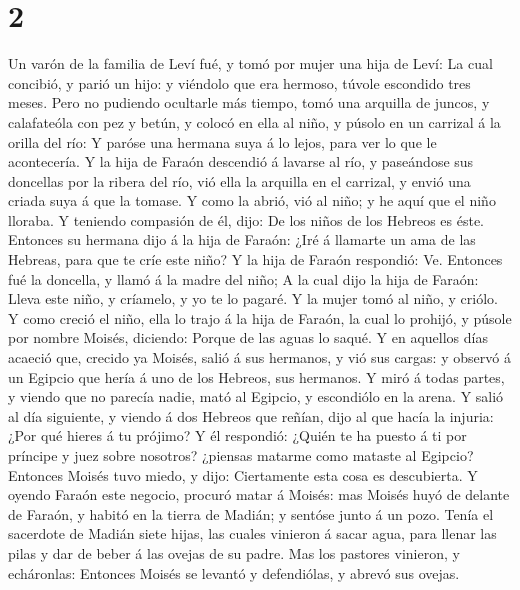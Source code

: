 \hypertarget{section-1}{%
\section{2}\label{section-1}}

 Un varón de la familia de Leví fué, y tomó por mujer una
hija de Leví:  La cual concibió, y parió un hijo: y viéndolo
que era hermoso, túvole escondido tres meses.  Pero no
pudiendo ocultarle más tiempo, tomó una arquilla de juncos, y
calafateóla con pez y betún, y colocó en ella al niño, y púsolo en un
carrizal á la orilla del río:  Y paróse una hermana suya á
lo lejos, para ver lo que le acontecería.  Y la hija de
Faraón descendió á lavarse al río, y paseándose sus doncellas por la
ribera del río, vió ella la arquilla en el carrizal, y envió una criada
suya á que la tomase.  Y como la abrió, vió al niño; y he
aquí que el niño lloraba. Y teniendo compasión de él, dijo: De los niños
de los Hebreos es éste.  Entonces su hermana dijo á la hija
de Faraón: ¿Iré á llamarte un ama de las Hebreas, para que te críe este
niño?  Y la hija de Faraón respondió: Ve. Entonces fué la
doncella, y llamó á la madre del niño;  A la cual dijo la
hija de Faraón: Lleva este niño, y críamelo, y yo te lo pagaré. Y la
mujer tomó al niño, y criólo.  Y como creció el niño, ella
lo trajo á la hija de Faraón, la cual lo prohijó, y púsole por nombre
Moisés, diciendo: Porque de las aguas lo saqué.  Y en
aquellos días acaeció que, crecido ya Moisés, salió á sus hermanos, y
vió sus cargas: y observó á un Egipcio que hería á uno de los Hebreos,
sus hermanos.  Y miró á todas partes, y viendo que no
parecía nadie, mató al Egipcio, y escondiólo en la arena. 
Y salió al día siguiente, y viendo á dos Hebreos que reñían, dijo al que
hacía la injuria: ¿Por qué hieres á tu prójimo?  Y él
respondió: ¿Quién te ha puesto á ti por príncipe y juez sobre nosotros?
¿piensas matarme como mataste al Egipcio? Entonces Moisés tuvo miedo, y
dijo: Ciertamente esta cosa es descubierta.  Y oyendo
Faraón este negocio, procuró matar á Moisés: mas Moisés huyó de delante
de Faraón, y habitó en la tierra de Madián; y sentóse junto á un pozo.
 Tenía el sacerdote de Madián siete hijas, las cuales
vinieron á sacar agua, para llenar las pilas y dar de beber á las ovejas
de su padre.  Mas los pastores vinieron, y echáronlas:
Entonces Moisés se levantó y defendiólas, y abrevó sus ovejas.
